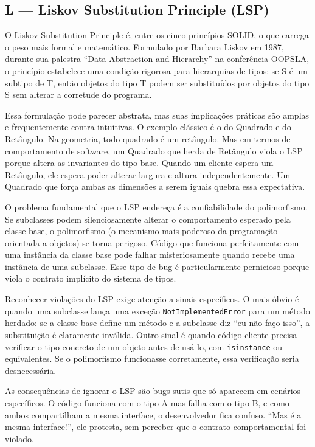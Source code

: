 \subsection{L --- Liskov Substitution Principle (LSP)}

O Liskov Substitution Principle é, entre os cinco princípios SOLID, o que
carrega o peso mais formal e matemático. Formulado por Barbara Liskov em
1987, durante sua palestra ``Data Abstraction and Hierarchy'' na conferência
OOPSLA, o princípio estabelece uma condição rigorosa para hierarquias de
tipos: se S é um subtipo de T, então objetos do tipo T podem ser substituídos
por objetos do tipo S sem alterar a corretude do programa.

Essa formulação pode parecer abstrata, mas suas implicações práticas são
amplas e frequentemente contra-intuitivas. O exemplo clássico é o do
Quadrado e do Retângulo. Na geometria, todo quadrado é um retângulo. Mas em
termos de comportamento de software, um Quadrado que herda de Retângulo
viola o LSP porque altera as invariantes do tipo base. Quando um cliente
espera um Retângulo, ele espera poder alterar largura e altura independentemente.
Um Quadrado que força ambas as dimensões a serem iguais quebra essa expectativa.

O problema fundamental que o LSP endereça é a confiabilidade do polimorfismo.
Se subclasses podem silenciosamente alterar o comportamento esperado pela
classe base, o polimorfismo (o mecanismo mais poderoso da programação
orientada a objetos) se torna perigoso. Código que funciona perfeitamente
com uma instância da classe base pode falhar misteriosamente quando recebe
uma instância de uma subclasse. Esse tipo de bug é particularmente pernicioso
porque viola o contrato implícito do sistema de tipos.

Reconhecer violações do LSP exige atenção a sinais específicos.
O mais óbvio é quando uma subclasse lança uma exceção \texttt{NotImplementedError}
para um método herdado: se a classe base define um método e a subclasse diz
``eu não faço isso'', a substituição é claramente inválida. Outro sinal é quando
código cliente precisa verificar o tipo concreto de um objeto antes de usá-lo,
com \texttt{isinstance} ou equivalentes. Se o polimorfismo funcionasse
corretamente, essa verificação seria desnecessária.

As consequências de ignorar o LSP são bugs sutis que só aparecem em cenários
específicos. O código funciona com o tipo A mas falha com o tipo B, e como
ambos compartilham a mesma interface, o desenvolvedor fica confuso. ``Mas é
a mesma interface!'', ele protesta, sem perceber que o contrato comportamental
foi violado.


